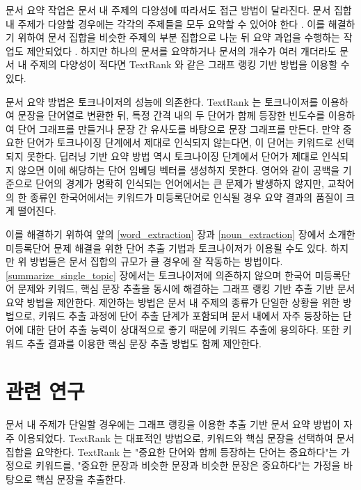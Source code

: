 \documentclass[oneside, ko,phd]{snuthesis_utf8_kor}
\begin{document}
문서 요약 작업은 문서 내 주제의 다양성에 따라서도 접근 방법이 달라진다.
문서 집합 내 주제가 다양할 경우에는 각각의 주제들을 모두 요약할 수 있어야 한다 \cite{yao2017recent}.
이를 해결하기 위하여 문서 집합을 비슷한 주제의 부분 집합으로 나눈 뒤 요약 과업을 수행하는 작업도 제안되었다 \cite{filippova2008sentence, filippova2010multi}.
하지만 하나의 문서를 요약하거나 문서의 개수가 여러 개더라도 문서 내 주제의 다양성이 적다면 TextRank 와 같은 그래프 랭킹 기반 방법을 이용할 수 있다.

문서 요약 방법은 토크나이저의 성능에 의존한다.
TextRank 는 토크나이저를 이용하여 문장을 단어열로 변환한 뒤, 특정 간격 내의 두 단어가 함께 등장한 빈도수를 이용하여 단어 그래프를 만들거나 문장 간 유사도를 바탕으로 문장 그래프를 만든다.
만약 중요한 단어가 토크나이징 단계에서 제대로 인식되지 않는다면, 이 단어는 키워드로 선택되지 못한다.
딥러닝 기반 요약 방법 역시 토크나이징 단계에서 단어가 제대로 인식되지 않으면 이에 해당하는 단어 임베딩 벡터를 생성하지 못한다.
영어와 같이 공백을 기준으로 단어의 경계가 명확히 인식되는 언어에서는 큰 문제가 발생하지 않지만, 교착어의 한 종류인 한국어에서는 키워드가 미등록단어로 인식될 경우 요약 결과의 품질이 크게 떨어진다.

이를 해결하기 위하여 앞의 \ref{word_extraction} 장과 \ref{noun_extraction} 장에서 소개한 미등록단어 문제 해결을 위한 단어 추출 기법과 토크나이저가 이용될 수도 있다.
하지만 위 방법들은 문서 집합의 규모가 클 경우에 잘 작동하는 방법이다.
\ref{summarize_single_topic} 장에서는 토크나이저에 의존하지 않으며 한국어 미등록단어 문제와 키워드, 핵심 문장 추출을 동시에 해결하는 그래프 랭킹 기반 추출 기반 문서 요약 방법을 제안한다.
제안하는 방법은 문서 내 주제의 종류가 단일한 상황을 위한 방법으로, 키워드 추출 과정에 단어 추출 단계가 포함되며 문서 내에서 자주 등장하는 단어에 대한 단어 추출 능력이 상대적으로 좋기 때문에 키워드 추출에 용의하다.
또한 키워드 추출 결과를 이용한 핵심 문장 추출 방법도 함께 제안한다.

\section{관련 연구}

문서 내 주제가 단일할 경우에는 그래프 랭킹을 이용한 추출 기반 문서 요약 방법이 자주 이용되었다.
TextRank \cite{mihalcea2004textrank} 는 대표적인 방법으로, 키워드와 핵심 문장을 선택하여 문서 집합을 요약한다.
TextRank 는 "중요한 단어와 함께 등장하는 단어는 중요하다"는 가정으로 키워드를, "중요한 문장과 비슷한 문장과 비슷한 문장은 중요하다"는 가정을 바탕으로 핵심 문장을 추출한다.
\end{document}

